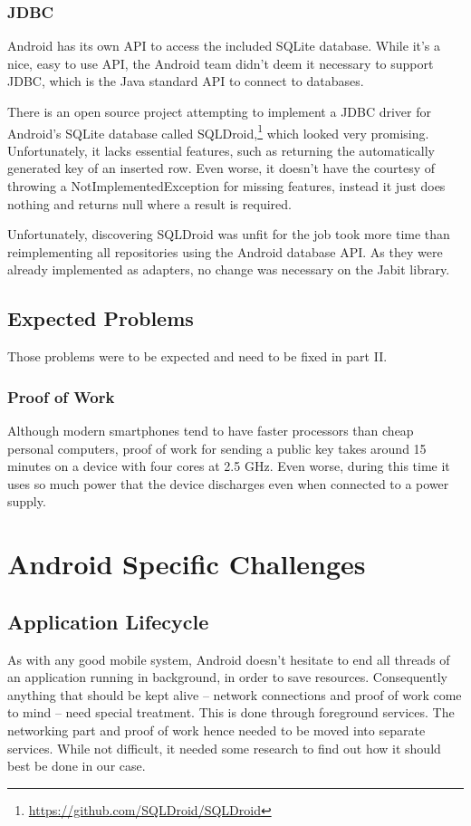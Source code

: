 \documentclass{bfh}
\begin{document}
  \subsubsection{JDBC}
  Android has its own API to access the included SQLite database. While it’s a nice, easy to use API, the Android team didn’t deem it necessary to support JDBC, which is the Java standard API to connect to databases.

  There is an open source project attempting to implement a JDBC driver for Android’s SQLite database called SQLDroid,\footnote{\url{https://github.com/SQLDroid/SQLDroid}} which looked very promising. Unfortunately, it lacks essential features, such as returning the automatically generated key of an inserted row. Even worse, it doesn't have the courtesy of throwing a NotImplementedException for missing features, instead it just does nothing and returns null where a result is required.

  Unfortunately, discovering SQLDroid was unfit for the job took more time than reimplementing all repositories using the Android database API. As they were already implemented as adapters, no change was necessary on the Jabit library.

  \subsection{Expected Problems}
  Those problems were to be expected and need to be fixed in part II.

  \subsubsection{Proof of Work}
  Although modern smartphones tend to have faster processors than cheap personal computers, proof of work for sending a public key takes around 15 minutes on a device with four cores at 2.5 GHz. Even worse, during this time it uses so much power that the device discharges even when connected to a power supply.

  \section{Android Specific Challenges}
  \subsection{Application Lifecycle}
  As with any good mobile system, Android doesn't hesitate to end all threads of an application running in background, in order to save resources. Consequently anything that should be kept alive -- network connections and proof of work come to mind -- need special treatment. This is done through foreground services. The networking part and proof of work hence needed to be moved into separate services. While not difficult, it needed some research to find out how it should best be done in our case.
  
\end{document}
